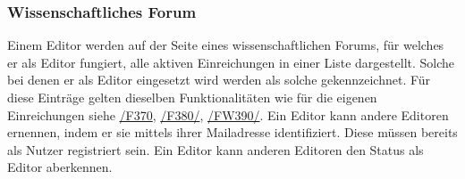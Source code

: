 \subsubsection{Wissenschaftliches Forum}
\begin{description}
     Einem Editor werden auf der Seite eines wissenschaftlichen Forums, für
    welches er als Editor fungiert, alle aktiven Einreichungen in einer Liste dargestellt.
    Solche bei denen er als Editor eingesetzt wird werden als solche gekennzeichnet.
    Für diese Einträge gelten dieselben Funktionalitäten wie für die
    eigenen Einreichungen siehe \hyperref[funkt:370]{/F370}, \hyperref[funkt:380]{/F380/}, \hyperref[funkt:390]{/FW390/}.
     Ein Editor kann andere Editoren ernennen, indem er sie mittels ihrer Mailadresse identifiziert.
    Diese müssen bereits als Nutzer registriert sein.
     Ein Editor kann anderen Editoren den Status als Editor aberkennen.
\end{description}

